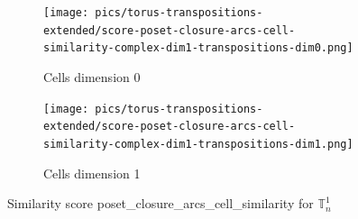 \documentclass{article}
\begin{document}
\begin{figure}[htbp]
\centering
\begin{subfigure}[b]{0.45\textwidth}
    \texttt{[image: pics/torus-transpositions-extended/score-poset-closure-arcs-cell-similarity-complex-dim1-transpositions-dim0.png]}
    \caption{Cells dimension 0}
    \label{fig:posetclosurearcscellsimilaritycomplex1cells0}
\end{subfigure}
\hfill
\begin{subfigure}[b]{0.45\textwidth}
    \texttt{[image: pics/torus-transpositions-extended/score-poset-closure-arcs-cell-similarity-complex-dim1-transpositions-dim1.png]}
    \caption{Cells dimension 1}
    \label{fig:posetclosurearcscellsimilaritycomplex1cells1}
\end{subfigure}
\caption{Similarity score poset\_closure\_arcs\_cell\_similarity for $\mathbb{T}_n^{1}$}
\label{fig:posetclosurearcscellsimilaritycomplex1}
\end{figure}
\end{document}
